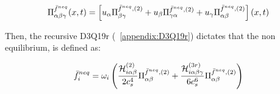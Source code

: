 \begin{equation}
    \Pi_{\alpha\beta\gamma}^{\Bar{f}^{neq}}(x,t) = \left[ u_\alpha \Pi_{\beta\gamma}^{\Bar{f}^{neq},(2)} + u_\beta \Pi_{\gamma\alpha}^{\Bar{f}^{neq},(2)} + u_\gamma \Pi_{\alpha\beta}^{\Bar{f}^{neq},(2)}\right](x,t)
\end{equation}

Then, the recursive D3Q19r (~\ref{appendix:D3Q19r}) dictates that the non equilibrium, is defined as:

\begin{equation}
    \Bar{f}^{neq}_i = \omega_i\left( \frac{\mathcal{H}_{i\alpha\beta}^{(2)}}{2c_s^4} \Pi_{\alpha\beta}^{\Bar{f}^{neq},(2)} + \frac{\mathcal{H}_{i\alpha\beta\gamma}^{(3r)}}{6c_s^6} \Pi_{\alpha\beta}^{\Bar{f}^{neq},(2)}\right)
\end{equation}
